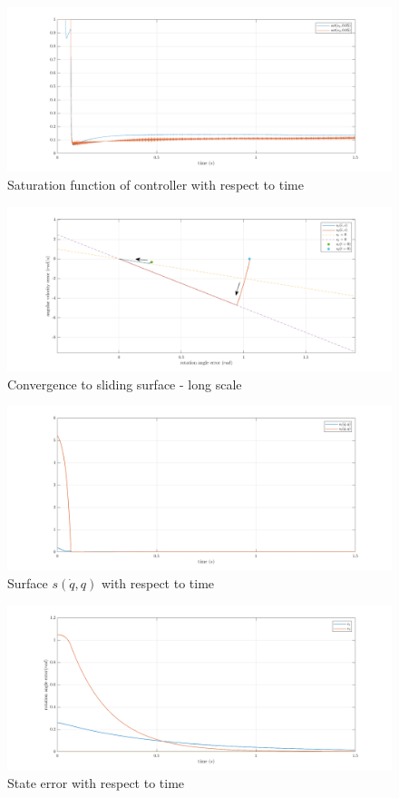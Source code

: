 \documentclass[a4paper]{article}
\begin{document}
\begin{figure}[H]
    \centering
    \includegraphics[width=15cm]{fig/sim2/sat.png}
    \caption{Saturation function of controller with respect to time}
\end{figure}
\begin{figure}[H]
    \centering
    \includegraphics[width=15cm]{fig/sim2/slidinglong.png}
    \caption{Convergence to sliding surface - long scale}
\end{figure}
\begin{figure}[H]
    \centering
    \includegraphics[width=15cm]{fig/sim2/s.png}
    \caption{Surface $s(\dot{q}, q)$ with respect to time}
\end{figure}
\begin{figure}[H]
    \centering
    \includegraphics[width=15cm]{fig/sim2/e.png}
    \caption{State error with respect to time}
\end{figure}
\end{document}
